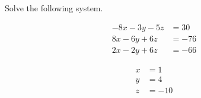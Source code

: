 
\begin{question}
Solve the following system.

\[\begin{aligned}
- 8 x - 3 y - 5 z&=30\\
8 x - 6 y + 6 z&=-76\\
2 x - 2 y + 6 z&=-66
\end{aligned}\]
\end{question}

\begin{solution}
\[\begin{aligned}
x&=1\\
y&=4\\
z&=-10
\end{aligned}\]
\end{solution}

